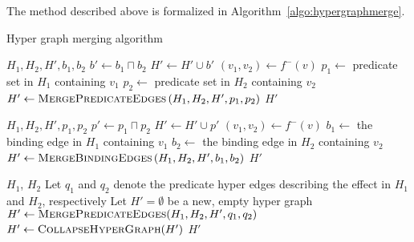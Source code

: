 \documentclass[../Master.tex]{subfiles}
\begin{document}
The method described above is formalized in Algorithm~\ref{algo:hypergraphmerge}.


\begin{algorithm}
    \caption{Hyper graph merging algorithm}
    \label{algo:hypergraphmerge}
    \begin{algorithmic}
         {$H_1, H_2, H', b_1, b_2$}
		\State $b' \gets b_1 \sqcap b_2$
            \State $H' \gets H' \cup b'$
                    \State $\left( v_1, v_2 \right) \gets f^-(v)$
                    \State $p_1 \gets$ predicate set in $H_1$ containing $v_1$
                    \State $p_2 \gets$ predicate set in $H_2$ containing $v_2$
                    \State $H' \gets \textsc{MergePredicateEdges}
                                        \left( H_1, H_2, H', p_1, p_2 \right)$
                \EndIf
            \EndFor
            \State \Return $H'$
        \EndFunction

         {$H_1, H_2, H', p_1, p_2$}
            \State $p' \gets p_1 \sqcap p_2$
            \State $H' \gets H' \cup p'$
                    \State $\left( v_1, v_2 \right) \gets f^-\left( v \right)$
                    \State $b_1 \gets$ the binding edge in $H_1$ containing $v_1$
                    \State $b_2 \gets$ the binding edge in $H_2$ containing $v_2$
                    \State $H' \gets \textsc{MergeBindingEdges}
                        \left( H_1, H_2, H', b_1, b_2 \right)$
                \EndIf
            \EndFor
            \State \Return $H'$
        \EndFunction

         {$H_1$, $H_2$}
            \State Let $q_1$ and $q_2$ denote the predicate hyper edges describing the effect in $H_1$ and $H_2$, respectively
            \State Let $H' = \emptyset$ be a new, empty hyper graph
            \State $H' \gets \textsc{MergePredicateEdges}(H_1,H_2,H',q_1,q_2)$
            \State $H' \gets \textsc{CollapseHyperGraph}(H')$
            \State \Return $H'$
        \EndFunction
    \end{algorithmic}
\end{algorithm}
\end{document}
